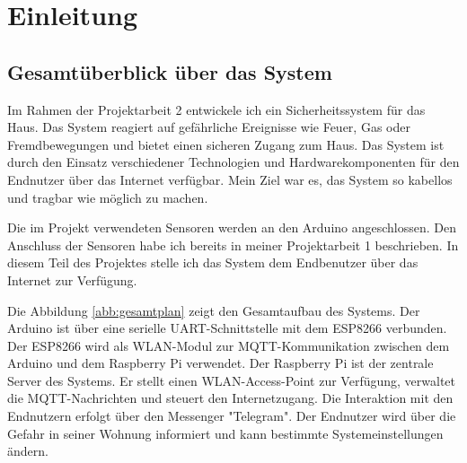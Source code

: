 \documentclass[12pt, letterpaper]{article}
\author{Oleksii Baida}
\date{Mai 2024}
\begin{document}


\tableofcontents
\pagebreak

\section{Einleitung}
\subsection{Gesamtüberblick über das System}
\par Im Rahmen der Projektarbeit 2 entwickele ich ein Sicherheitssystem für das Haus. Das System reagiert auf gefährliche Ereignisse wie Feuer, Gas oder Fremdbewegungen und bietet einen sicheren Zugang zum Haus. Das System ist durch den Einsatz verschiedener Technologien und Hardwarekomponenten für den Endnutzer über das Internet verfügbar. Mein Ziel war es, das System so kabellos und tragbar wie möglich zu machen.
\par Die im Projekt verwendeten Sensoren werden an den Arduino angeschlossen. Den Anschluss der Sensoren habe ich bereits in meiner Projektarbeit 1 \cite{pa1} beschrieben. In diesem Teil des Projektes stelle ich das System dem Endbenutzer über das Internet zur Verfügung. 
\par Die Abbildung \ref{abb:gesamtplan} zeigt den Gesamtaufbau des Systems. Der Arduino ist über eine serielle UART-Schnittstelle mit dem ESP8266 verbunden. Der ESP8266 wird als WLAN-Modul zur MQTT-Kommunikation zwischen dem Arduino und dem Raspberry Pi verwendet. Der Raspberry Pi ist der zentrale Server des Systems. Er stellt einen WLAN-Access-Point zur Verfügung, verwaltet die MQTT-Nachrichten und steuert den Internetzugang. Die Interaktion mit den Endnutzern erfolgt über den Messenger "Telegram". Der Endnutzer wird über die Gefahr in seiner Wohnung informiert und kann bestimmte Systemeinstellungen ändern. 
\end{document}
